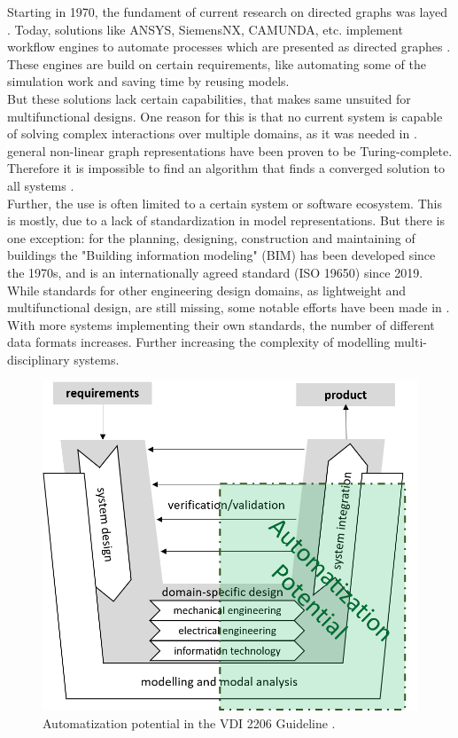 Starting in 1970, the fundament of current research on directed graphs was layed \cite{allen_control_1970}.
Today, solutions like ANSYS, SiemensNX, CAMUNDA, etc. implement workflow engines to automate processes which are presented as directed graphes \cite{noauthor_dynamo_2020, noauthor_function_2020, noauthor_systems_2020}.
These engines are build on certain requirements, like automating some of the simulation work and saving time by reusing models.\\
But these solutions lack certain capabilities, that makes same unsuited for multifunctional designs.
One reason for this is that no current system is capable of solving complex interactions over multiple domains,
as it was needed in \cite{Weck2016, Hufenbach2011}.
 general non-linear graph representations have been proven to be Turing-complete.
Therefore it is impossible to find an algorithm that finds a converged solution to all systems \cite{Ajtai1990}.\\
Further, the use is often limited to a certain system or software ecosystem.
This is mostly, due to a lack of standardization in model representations.
But there is one exception: for the planning, designing, construction and maintaining of buildings the 
"Building information modeling" (BIM) has been developed since the 1970s, and is an internationally agreed standard (ISO 19650) since 2019.
While standards for other engineering design domains, as lightweight and multifunctional design, are still missing, some notable efforts have been made in \cite{noauthor_modelica_nodate, mukherjee_hierarchical_1999,  Berschik2021}.
With more systems implementing their own standards, the number of different data formats increases.
Further increasing the complexity of modelling multi-disciplinary systems.
\begin{figure}[h]
    \centering
    \includegraphics[scale=0.6]{pics/VDI_2206.PNG}
    \caption{\label{pic:VDI2206} Automatization potential in the VDI 2206 Guideline \cite{Jansch2006THEDO}.}
\end{figure}\\
